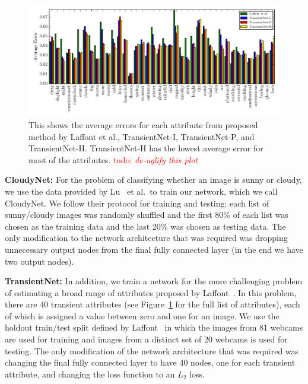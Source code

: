 \documentclass[10pt,twocolumn,letterpaper]{article}
\newcommand{\todo}[1]{\textcolor{red}{todo: {\em #1}}}
\newcommand{\figref}[1]{Figure~\ref{fig:#1}}
\begin{document}
\begin{figure}[t!]
	\centering
		\includegraphics[width=1.0\textwidth, trim= 0 4mm 0 0]{figs/avg_err_compare_cmr.pdf}
		\caption{This shows the average errors for each attribute from proposed method
						 by Laffont et al., TransientNet-I, TransientNet-P, and TransientNet-H.  
             TransientNet-H has the lowest average error for most of the attributes.
             \todo{de-uglify this plot}}
		\label{fig:compare}
\end{figure}

\textbf{CloudyNet:} For the problem of classifying whether an image is sunny or
cloudy, we use the data provided by Lu~\cite{lutwoclass} et al.\ to train our
network, which we call CloudyNet.  We follow their protocol for training and
testing: each list of sunny/cloudy images was randomly shuffled and the first
80\% of each list was chosen as the training data and the last 20\% was chosen
as testing data.  The only modification to the network architecture that was
required was dropping unnecessary output nodes from the final fully connected
layer (in the end we have two output nodes).

\textbf{TransientNet:} In addition, we train a network for the more challenging
problem of estimating a broad range of attributes proposed by
Laffont~\cite{Laffont14}.  In this problem, there are 40 transient attributes
(see \figref{compare} for the full list of attributes), each of which is
assigned a value between zero and one for an image. We use the holdout
train/test split defined by Laffont~\cite{Laffont14} in which the images from
81 webcams are used for training and images from a distinct set of 20 webcams
is used for testing.  The only modification of the network architecture that
was required was changing the final fully connected layer to have 40 nodes, one
for each transient attribute, and changing the loss function to an $L_2$ loss. 
\end{document}
